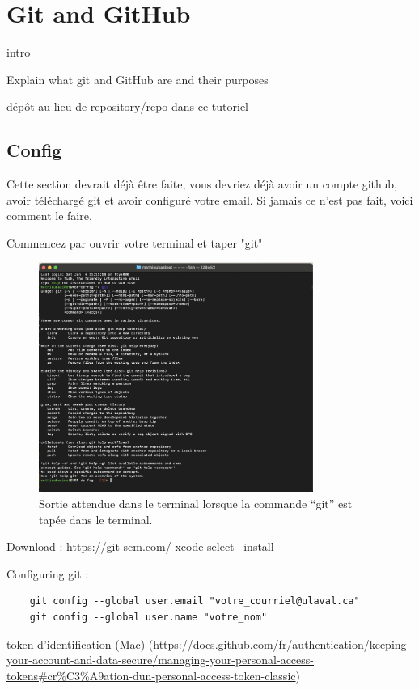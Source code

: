 \documentclass{book}
\begin{document}
\setlength{\parindent}{0cm}
\chapter{Git and GitHub}

intro

Explain what git and GitHub are and their purposes

dépôt au lieu de repository/repo dans ce tutoriel

\section{Config}

Cette section devrait déjà être faite, vous devriez déjà avoir un compte github, avoir téléchargé git et avoir configuré votre email. Si jamais ce n'est pas fait, voici comment le faire. 

Commencez par ouvrir votre terminal et taper "git" 

\begin{figure}[!h]
    \centering
    \includegraphics[width=0.8\textwidth]{images/check_if_git.png}
    \caption{Sortie attendue dans le terminal lorsque la commande ``git'' est tapée dans le terminal.} \label{fig:check_if_git}
\end{figure}
Download : 
	\url{https://git-scm.com/}
	xcode-select --install

Configuring git :
\begin{lstlisting}
	git config --global user.email "votre_courriel@ulaval.ca"
	git config --global user.name "votre_nom"
\end{lstlisting}
token d’identification (Mac) (\url{https://docs.github.com/fr/authentication/keeping-your-account-and-data-secure/managing-your-personal-access-tokens\#cr%C3%A9ation-dun-personal-access-token-classic}) 
\end{document}
